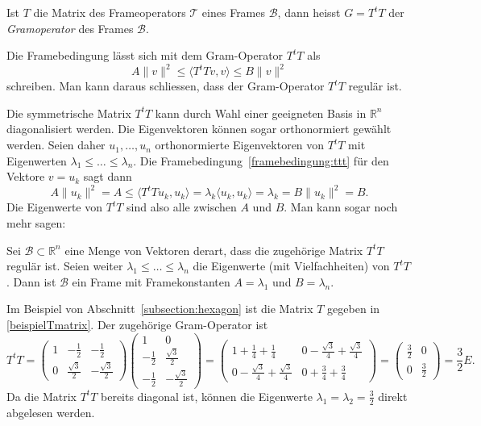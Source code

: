 \begin{definition}
\label{definition:gram-operator}
Ist $T$ die Matrix des Frameoperators $\mathcal{T}$ eines Frames
$\mathcal{B}$, dann heisst $G=T^tT$ der {\em Gramoperator} des Frames
$\mathcal{B}$.
\end{definition}

Die Framebedingung lässt sich mit dem Gram-Operator $T^tT$ als
\begin{equation}
A \|v\|^2
\le
\langle T^t T v,v\rangle
\le
B \|v\|^2
\label{framebedingung:ttt}
\end{equation}
schreiben.
Man kann daraus schliessen, dass der Gram-Operator $T^tT$ regulär ist.

Die symmetrische Matrix $T^tT$ kann durch Wahl einer geeigneten Basis
in $\mathbb R^n$ diagonalisiert werden.
Die Eigenvektoren können sogar orthonormiert gewählt werden.
Seien daher $u_1,\dots,u_n$ orthonormierte Eigenvektoren von $T^tT$
mit Eigenwerten $\lambda_1\le\dots\le\lambda_n$.
Die Framebedingung~\eqref{framebedingung:ttt}
für den Vektore $v=u_k$ sagt dann
\[
A \| u_k\|^2
=
A
\le
\langle T^tTu_k,u_k\rangle
=
\lambda_k\langle u_k,u_k\rangle
=
\lambda_k
=
B \| u_k\|^2
=
B.
\]
Die Eigenwerte von $T^tT$ sind also alle zwischen $A$ und $B$.
Man kann sogar noch mehr sagen:

\begin{satz}
Sei $\mathcal{B}\subset\mathbb R^n$ eine Menge von Vektoren derart,
dass die zugehörige Matrix $T^tT$ regulär ist.
Seien weiter $\lambda_1\le\dots\le \lambda_n$ die Eigenwerte
(mit Vielfachheiten) von $T^tT$.
Dann ist $\mathcal{B}$ ein Frame mit Framekonstanten
$A=\lambda_1$ und $B=\lambda_n$.
\end{satz}

\begin{beispiel}
Im Beispiel von Abschnitt~\ref{subsection:hexagon} ist die Matrix $T$
gegeben in \eqref{beispielTmatrix}.
Der zugehörige Gram-Operator ist
\[
T^tT
=
\begin{pmatrix}
1& -\frac12        &-\frac12          \\[2pt]
0& \frac{\sqrt{3}}2& -\frac{\sqrt{3}}2
\end{pmatrix}
\begin{pmatrix}
1&0\\
-\frac12&\frac{\sqrt{3}}2\\[2pt]
-\frac12&-\frac{\sqrt{3}}2
\end{pmatrix}
=
\begin{pmatrix}
1+\frac14+\frac14 & 0-\frac{\sqrt{3}}4+\frac{\sqrt{3}}4\\[2pt]
0-\frac{\sqrt{3}}4+\frac{\sqrt{3}}4&0+\frac{3}{4}+\frac{3}{4}
\end{pmatrix}
=
\begin{pmatrix}
\frac32&0\\
0&\frac32
\end{pmatrix}
=
\frac{3}{2}E.
\]
Da die Matrix $T^tT$ bereits diagonal ist, können die Eigenwerte
$\lambda_1=\lambda_2=\frac32$ direkt abgelesen werden.
\end{beispiel}

